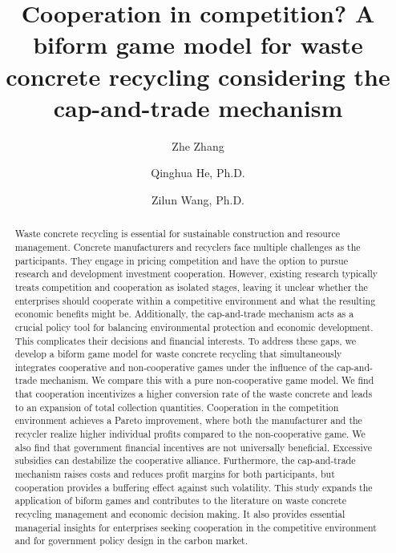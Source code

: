 \documentclass[authoryear,preprint,review,times,10pt]{elsarticle}
\begin{document}
\newtheorem{prop}{Proposition}

\modulolinenumbers[1]
\runninglinenumbers
\begin{frontmatter}

\title{Cooperation in competition? A biform game model for waste concrete recycling considering the cap-and-trade mechanism}

\author[1]{Zhe Zhang}
\author[2]{Qinghua He, Ph.D.}
\author[3]{Zilun Wang, Ph.D.}



\begin{abstract}

  Waste concrete recycling is essential for sustainable construction and resource management. Concrete manufacturers and recyclers face multiple challenges as the participants. They engage in pricing competition and have the option to pursue research and development investment cooperation. However, existing research typically treats competition and cooperation as isolated stages, leaving it unclear whether the enterprises should cooperate within a competitive environment and what the resulting economic benefits might be. Additionally, the cap-and-trade mechanism acts as a crucial policy tool for balancing environmental protection and economic development. This complicates their decisions and financial interests. To address these gaps, we develop a biform game model for waste concrete recycling that simultaneously integrates cooperative and non-cooperative games under the influence of the cap-and-trade mechanism. We compare this with a pure non-cooperative game model. We find that cooperation incentivizes a higher conversion rate of the waste concrete and leads to an expansion of total collection quantities. Cooperation in the competition environment achieves a Pareto improvement, where both the manufacturer and the recycler realize higher individual profits compared to the non-cooperative game. We also find that government financial incentives are not universally beneficial. Excessive subsidies can destabilize the cooperative alliance. Furthermore, the cap-and-trade mechanism raises costs and reduces profit margins for both participants, but cooperation provides a buffering effect against such volatility. This study expands the application of biform games and contributes to the literature on waste concrete recycling management and economic decision making. It also provides essential managerial insights for enterprises seeking cooperation in the competitive environment and for government policy design in the carbon market.


\end{abstract}
\end{frontmatter}
\end{document}
